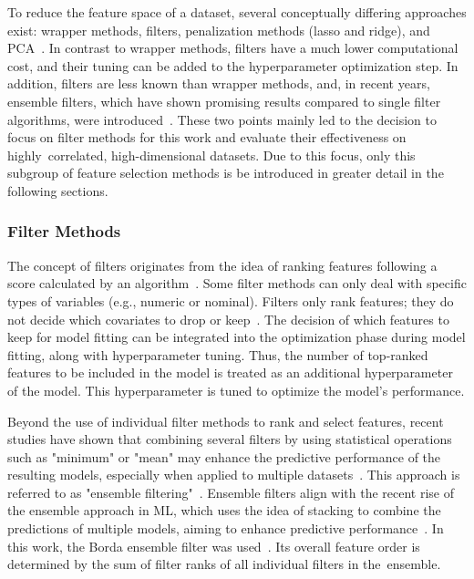 \documentclass[remotesensing,article,accept,moreauthors,pdftex]{Definitions/mdpi}
\begin{document}
\begin{paracol}{2}
To reduce the feature space of a dataset, several conceptually differing approaches exist: wrapper methods, filters, penalization methods (lasso and ridge), and \ac{PCA}~\cite{bommert2020, das2001, guyon2003, jolliffe2016}.
In contrast to wrapper methods, filters have a much lower computational cost, and their tuning can be added to the hyperparameter optimization step.
In addition, filters are less known than wrapper methods, and, in recent years, ensemble filters, which have shown promising results compared to single filter algorithms, were introduced~\cite{drotar2017}.
These two points mainly led to the decision to focus on filter methods for this work and evaluate their effectiveness on highly\ correlated, high-dimensional datasets.
Due to this focus, only this subgroup of feature selection methods is be introduced in greater detail in the following sections.

\subsubsection{Filter Methods}

The concept of filters originates from the idea of ranking features following a score calculated by an algorithm~\cite{guyon2003}.
Some filter methods can only deal with specific types of variables (e.g., numeric or nominal).
Filters only rank features; they do not decide which covariates to drop or keep~\cite{drotar2015}.
The decision of which features to keep for model fitting can be integrated into the optimization phase during model fitting, along with hyperparameter tuning.
Thus, the number of top-ranked features to be included in the model is treated as an additional hyperparameter of the model.
This hyperparameter is tuned to optimize the model's performance.

Beyond the use of individual filter methods to rank and select features, recent studies have shown that combining several filters by using statistical operations such as "minimum" or "mean" may enhance the predictive performance of the resulting models, especially when applied to multiple datasets~\cite{abeel2010, drotar2017}.
This approach is referred to as "ensemble filtering"~\cite{dietterich2000}.
Ensemble filters align with the recent rise of the ensemble approach in ML, which uses the idea of stacking to combine the predictions of multiple models, aiming to enhance predictive performance~\cite{polikar2012, feurer2015, bolon-canedo2019}.
In this work, the Borda ensemble filter was used~\cite{drotar2017}.
Its overall feature order is determined by the sum of filter ranks of all individual filters in the~ensemble.


\end{paracol}
\end{document}
